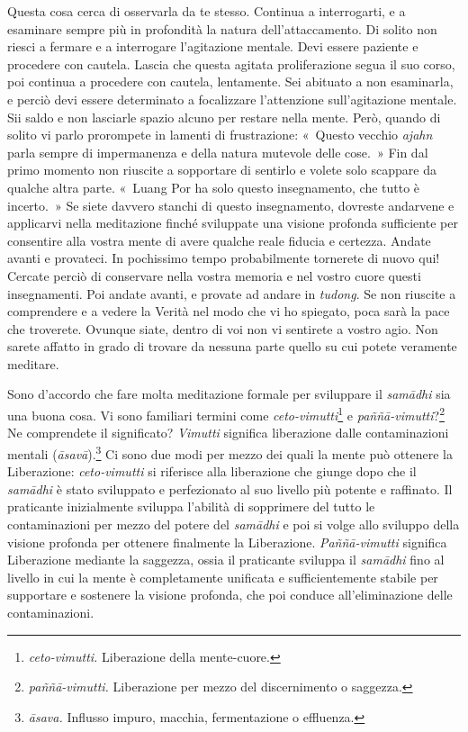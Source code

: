 Questa cosa cerca di osservarla da te stesso. Continua a interrogarti, e
a esaminare sempre più in profondità la natura dell'attaccamento. Di
solito non riesci a fermare e a interrogare l'agitazione mentale. Devi
essere paziente e procedere con cautela. Lascia che questa agitata
proliferazione segua il suo corso, poi continua a procedere con cautela,
lentamente. Sei abituato a non esaminarla, e perciò devi essere
determinato a focalizzare l'attenzione sull'agitazione mentale. Sii
saldo e non lasciarle spazio alcuno per restare nella mente. Però,
quando di solito vi parlo prorompete in lamenti di frustrazione:
«~Questo vecchio \emph{ajahn} parla sempre di impermanenza e della
natura mutevole delle cose.~» Fin dal primo momento non riuscite a
sopportare di sentirlo e volete solo scappare da qualche altra parte.
«~Luang Por ha solo questo insegnamento, che tutto è incerto.~» Se siete
davvero stanchi di questo insegnamento, dovreste andarvene e applicarvi
nella meditazione finché sviluppate una visione profonda sufficiente per
consentire alla vostra mente di avere qualche reale fiducia e certezza.
Andate avanti e provateci. In pochissimo tempo probabilmente tornerete
di nuovo qui! Cercate perciò di conservare nella vostra memoria e nel
vostro cuore questi insegnamenti. Poi andate avanti, e provate ad andare
in \emph{tudong}. Se non riuscite a comprendere e a vedere la Verità nel
modo che vi ho spiegato, poca sarà la pace che troverete. Ovunque siate,
dentro di voi non vi sentirete a vostro agio. Non sarete affatto in
grado di trovare da nessuna parte quello su cui potete veramente
meditare.

Sono d'accordo che fare molta meditazione formale per sviluppare il
\emph{samādhi} sia una buona cosa. Vi sono familiari termini come
\emph{ceto-vimutti}\footnote{\emph{ceto-vimutti.} Liberazione della
  mente-cuore.} e \emph{paññā-vimutti}?\footnote{\emph{paññā-vimutti.}
  Liberazione per mezzo del discernimento o saggezza.} Ne comprendete il
significato? \emph{Vimutti} significa liberazione dalle contaminazioni
mentali (\emph{āsavā}).\footnote{\emph{āsava.} Influsso impuro, macchia,
  fermentazione o effluenza.} Ci sono due modi per mezzo dei quali la
mente può ottenere la Liberazione: \emph{ceto-vimutti} si riferisce alla
liberazione che giunge dopo che il \emph{samādhi} è stato sviluppato e
perfezionato al suo livello più potente e raffinato. Il praticante
inizialmente sviluppa l'abilità di sopprimere del tutto le
contaminazioni per mezzo del potere del \emph{samādhi} e poi si volge
allo sviluppo della visione profonda per ottenere finalmente la
Liberazione. \emph{Paññā-vimutti} significa Liberazione mediante la
saggezza, ossia il praticante sviluppa il \emph{samādhi} fino al livello
in cui la mente è \mbox{completamente} unificata e sufficientemente stabile per
supportare e sostenere la visione profonda, che poi conduce
all'eliminazione delle contaminazioni.

